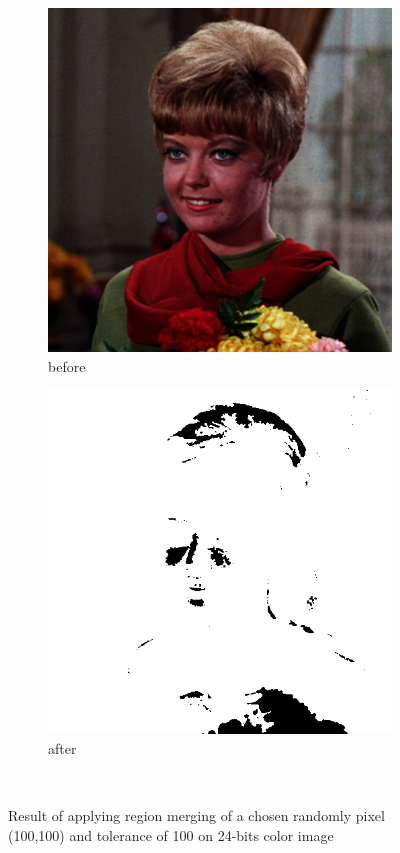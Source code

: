 \documentclass[12pt]{article}
\renewcommand{\subfiguresize}{.25\textwidth}
\begin{document}
\begin{figure}[H]\centering
    \begin{subfigure}[t]{\subfiguresize}
        \includegraphics[width=\textwidth]{img/magda/girlc.png}
        \caption{before}
    \end{subfigure}
    \hspace{2em}
    \begin{subfigure}[t]{\subfiguresize}
        \includegraphics[width=\textwidth]{img/magda/region_output_new2.png}
        \caption{after}
    \end{subfigure}\\[2em]
    \caption{Result of applying region merging of a chosen randomly pixel (100,100) and tolerance of 100 on 24-bits color image}
\end{figure}
\end{document}
